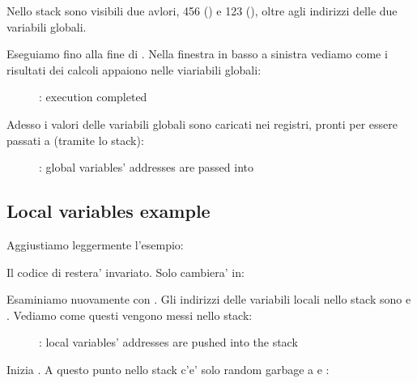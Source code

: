 Nello stack sono visibili due avlori, 456 () e
123 (), oltre agli indirizzi delle due variabili globali.

\clearpage

Eseguiamo fino alla fine di \ttfone.
Nella finestra in basso a sinistra vediamo come i risultati dei calcoli appaiono nelle viariabili globali:

\begin{figure}[H]
\centering
{}
\caption{\olly: \ttfone execution completed}
\label{fig:pointers_olly_global_3}
\end{figure}

\clearpage

Adesso i valori delle variabili globali sono caricati nei registri, pronti per essere passati a \printf (tramite lo stack):

\begin{figure}[H]
\centering
{}
\caption{\olly: 
global variables' addresses are passed into \printf}
\label{fig:pointers_olly_global_4}
\end{figure}

\subsection{Local variables example}

Aggiustiamo leggermente l'esempio:



Il codice di \ttfone restera' invariato.
Solo \main cambiera' in:



\clearpage
Esaminiamo nuovamente con \olly.
Gli indirizzi delle variabili locali nello stack sono  e .
Vediamo come questi vengono messi nello stack: 

\begin{figure}[H]
\centering
{}
\caption{\olly: local variables' addresses are
pushed into the stack}
\label{fig:pointers_olly_stk_1}
\end{figure}

\clearpage
Inizia \ttfone.
A questo punto nello stack c'e' solo random garbage a  e :

